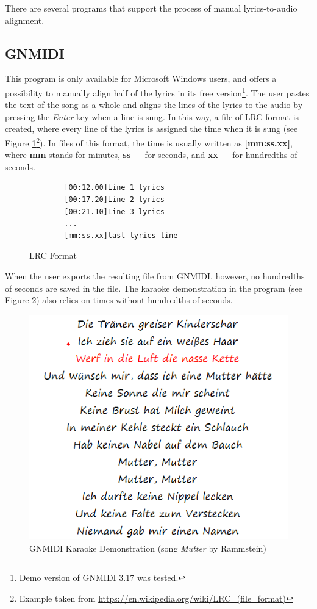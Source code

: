 There are several programs that support the process of manual lyrics-to-audio alignment.

\subsection{GNMIDI}

This program is only available for Microsoft Windows users, and offers a possibility to manually align half of the lyrics in its free version\footnote{Demo version of GNMIDI 3.17 was tested.}. The user pastes the text of the song as a whole and aligns the lines of the lyrics to the audio by pressing the \textit{Enter} key when a line is sung. In this way, a file of LRC format is created, where every line of the lyrics is assigned the time when it is sung (see Figure \ref{fig:lrcFormat}\footnote{Example taken from \url{https://en.wikipedia.org/wiki/LRC_(file_format)}}). In files of this format, the time is usually written as \textbf{[mm:ss.xx]}, where \textbf{mm} stands for minutes, \textbf{ss} --- for seconds, and \textbf{xx} --- for hundredths of seconds. 

\begin{figure}[H]
    \begin{verbatim} 
        [00:12.00]Line 1 lyrics
        [00:17.20]Line 2 lyrics
        [00:21.10]Line 3 lyrics
        ...
        [mm:ss.xx]last lyrics line  \end{verbatim}
    \caption{LRC Format}
    \label{fig:lrcFormat}
\end{figure}

When the user exports the resulting file from GNMIDI, however, no hundredths of seconds are saved in the file. The karaoke demonstration in the program (see Figure \ref{fig:karaokeDemo}) also relies on times without hundredths of seconds. 

\begin{figure}[H]
    \centering
    \includegraphics{../images/gnmidiScreenshot.png}
    \caption{GNMIDI Karaoke Demonstration (song \textit{Mutter} by Rammstein)}
    \label{fig:karaokeDemo}
\end{figure}

